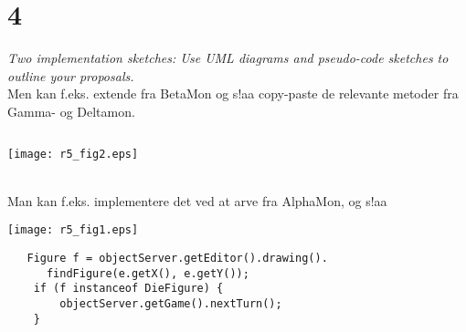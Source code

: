 \documentclass[a4paper]{article}
\begin{document}
\lhead{}
\rhead{}

\section*{4}
\textit{Two implementation sketches: Use UML diagrams and pseudo-code 
sketches to outline your proposals.} \\
Men kan f.eks. extende fra BetaMon og s!aa copy-paste de relevante
metoder fra Gamma- og Deltamon.
\begin{verbatim}

\end{verbatim}
\begin{center}
\texttt{[image: r5\_fig2.eps]}
\end{center} \\

Man kan f.eks. implementere det ved at arve fra AlphaMon, og s!aa

\texttt{[image: r5\_fig1.eps]}


\begin{verbatim}
   Figure f = objectServer.getEditor().drawing().
      findFigure(e.getX(), e.getY());
    if (f instanceof DieFigure) {
        objectServer.getGame().nextTurn();
    } 
\end{verbatim}
\end{document}

